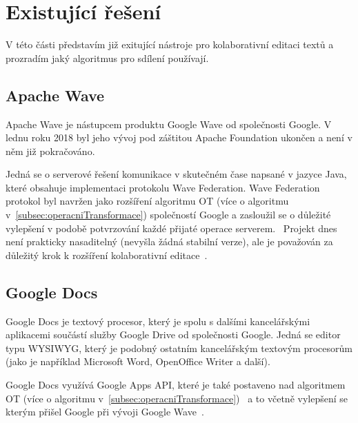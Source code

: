 
\section{Existující řešení}\label{sec:existujícíŘešení}
V této části představím již exitující nástroje pro kolaborativní editaci textů a prozradím jaký algoritmus pro sdílení používají.

\subsection{Apache Wave}\label{subsec:apacheWave}
Apache Wave je nástupcem produktu Google Wave od společnosti Google.
V lednu roku 2018 byl jeho vývoj pod záštitou Apache Foundation ukončen a není v něm již pokračováno.~\cite{wave:apache}

Jedná se o serverové řešení komunikace v skutečném čase napsané v jazyce Java, které obsahuje implementaci protokolu Wave Federation.
Wave Federation protokol byl navržen jako rozšíření algoritmu \gls{OT} (více o algoritmu v~\ref{subsec:operacniTransformace}) společností Google a zasloužil se o důležité vylepšení v podobě potvrzování každé přijaté operace serverem.~\cite{wave:apache, wave:google}
Projekt dnes není prakticky nasaditelný (nevyšla žádná stabilní verze), ale je považován za důležitý krok k rozšíření kolaborativní editace~\cite{ot:codecommit}.

\subsection{Google Docs}\label{subsec:googleDocs}
Google Docs je textový procesor, který je spolu s dalšími kancelářskými aplikacemi součástí služby Google Drive od společnosti Google.
Jedná se editor typu \gls{WYSIWYG}, který je podobný ostatním kancelářským textovým procesorům (jako je například Microsoft Word, OpenOffice Writer a další).~\cite{docs:top10}

Google Docs využívá Google Apps API, které je také postaveno nad algoritmem \gls{OT} (více o algoritmu v~\ref{subsec:operacniTransformace})~\cite{docs:conflict} a to včetně vylepšení se kterým přišel Google při vývoji Google Wave~\cite{docs:appsConf}.

